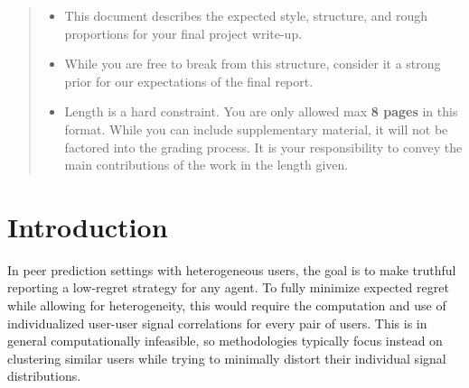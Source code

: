 \documentclass{article}
\begin{document}

\begin{abstract}
  \begin{itemize}
  \item This document describes the expected style, structure, and rough proportions for your final project write-up.
  \item While you are free to break from this structure, consider it a strong prior for our expectations of the final report.
\item Length is a hard constraint. You are only allowed max \textbf{8 pages} in this format. While you can include supplementary material, it will not be factored into the grading process. It is your responsibility to convey the main contributions of the work in the length given.
  \end{itemize}


\lipsum[1]
\end{abstract}

\section{Introduction}
\label{sec:introduction}


In peer prediction settings with heterogeneous users, the goal is to make truthful reporting a low-regret strategy for any agent. To fully minimize expected regret while allowing for heterogeneity, this would require the computation and use of individualized user-user signal correlations for every pair of users. This is in general computationally infeasible, so methodologies typically focus instead on clustering similar users while trying to minimally distort their individual signal distributions. 
\end{document}
